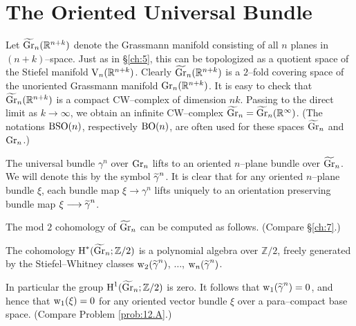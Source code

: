 \documentclass[../main]{subfiles}
\begin{document}
\section{The Oriented Universal Bundle}
Let ${\xtilde \grassmannian}_n({\mathbb R}^{n + k})$ denote the Grassmann manifold consisting of all  $n$ planes in $(n + k)$--space. Just as in \S\ref{ch:5}, this can be topologized as a quotient space of the Stiefel manifold $\operatorname{V}_n({\mathbb R}^{n + k})$. Clearly ${\xtilde \grassmannian}_n({\mathbb R}^{n + k})$ is a $2$--fold covering space of the unoriented Grassmann manifold $\operatorname{Gr}_n({\mathbb R}^{n + k})$. It is easy to check that ${\xtilde \grassmannian}_n({\mathbb R}^{n + k})$ is a compact CW--complex of dimension $n k$. Passing to the direct limit as $k \to \infty$, we obtain an infinite CW--complex ${\xtilde \grassmannian}_n = {\xtilde \grassmannian}_n({\mathbb R}^\infty)$. (The notations $\operatorname{BSO}(n)$, respectively $\operatorname{BO}(n)$, are often used for these spaces ${\xtilde \grassmannian}_n$ and $\operatorname{Gr}_n$.)

The universal bundle $\gamma^n$ over $\operatorname{Gr}_n$ lifts to an oriented $n$--plane bundle over ${\xtilde \grassmannian}_n$. We will denote this  by the symbol ${\xtilde \gamma}^n$. It is clear that for any oriented $n$--plane bundle $\xi$, each bundle map $\xi \longrightarrow \gamma^n$ lifts uniquely to an orientation preserving bundle map $\xi \longrightarrow {\xtilde \gamma}^n$. 

The mod $2$ cohomology of ${\xtilde \grassmannian}_n$ can be computed as follows. (Compare \S\ref{ch:7}.)

\begin{theorem}
\label{thm:12.4}
The cohomology $\homology^\ast({\xtilde \grassmannian}_n; {\mathbb Z}/2)$ is a polynomial algebra over ${\mathbb Z}/2$, freely generated by the Stiefel--Whitney classes $\sw_2({\xtilde \gamma}^n)$, $\ldots$, $\sw_n({\xtilde \gamma}^n)$.
\end{theorem}

In particular the group $\homology^1({\xtilde \grassmannian}_n; {\mathbb Z}/2)$ is zero. It follows that $\sw_1({\xtilde \gamma}^n) = 0$, and hence that $\operatorname{w}_1(\xi) = 0$ for any oriented vector bundle $\xi$ over a para--compact base space. (Compare Problem \ref{prob:12.A}.)
\end{document}
